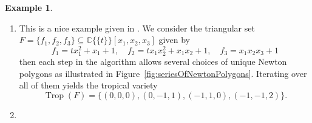 \documentclass[
  paper=a4,
  titlepage,
  bibliography=totoc,
  listof=totoc,
  pagesize=pdftex
]{scrartcl}
\numberwithin{figure}{section}
\numberwithin{equation}{section}
\numberwithin{table}{section}
\newcommand*\setC{\mathds{C}}
\newcommand*\puiseux[2]{#1\{\!\{#2\}\!\}}
\newcommand*\CCt{\puiseux{\setC}{t}}
\DeclareMathOperator{\Trop}{Trop}
\theoremstyle{definition}
\newtheorem{example}[definition]{Example}
\numberwithin{definition}{section}
\begin{document}
\begin{example} \label{ex:zeroDimTrop}\
  \begin{enumerate}
    \item This is a nice example given in \cite[Example~2.13]{tropPointsLinks}. We
      consider the triangular set $F = \{ f_1, f_2, f_3 \} \subseteq \CCt[x_1, x_2, x_3]$
      given by
      \[
        f_1 = tx_1^2 + x_1 + 1, \quad
        f_2 = tx_1x_2^2 + x_1x_2 + 1, \quad
        f_3 = x_1x_2x_3+1
      \]
      then each step in the algorithm allows several choices of unique Newton polygons as
      illustrated in Figure~\ref{fig:seriesOfNewtonPolygons}. Iterating over all of them
      yields the tropical variety
      \[
        \Trop(F) = \{ (0,0,0), (0,-1,1), (-1,1,0),(-1,-1,2) \}.
      \]
    \item %
      \label{ex:zdt2}
  \end{enumerate}
\end{example}
\end{document}
